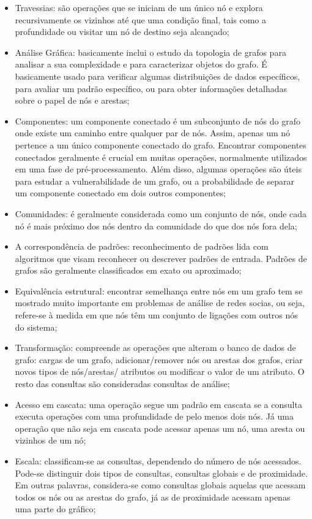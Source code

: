 \begin{itemize}
\item Travessias: são operações que se iniciam de um único nó e explora recursivamente os vizinhos até que uma condição final, tais como a profundidade ou visitar um nó de destino seja alcançado;
\item Análise Gráfica: basicamente inclui o estudo da topologia de grafos para analisar a sua complexidade e para caracterizar objetos do grafo. É basicamente usado para verificar algumas distribuições de dados específicos, para avaliar um padrão específico, ou para obter informações detalhadas sobre o papel de nós e arestas;
\item Componentes: um componente conectado é um subconjunto de nós do grafo onde existe um caminho entre qualquer par de nós. Assim, apenas um nó pertence a um único componente conectado do grafo. Encontrar componentes conectados geralmente é crucial em muitas operações, normalmente utilizados em uma fase de pré-processamento. Além disso, algumas operações são úteis para estudar a vulnerabilidade de um grafo, ou a probabilidade de separar um componente conectado em dois outros componentes;
\item Comunidades: é geralmente considerada como um conjunto de nós, onde cada nó é mais próximo dos nós dentro da comunidade do que dos nós fora dela;
\item A correspondência de padrões: reconhecimento de padrões lida com algoritmos que visam reconhecer ou descrever padrões de entrada. Padrões de grafos são geralmente classificados em exato ou aproximado;
\item Equivalência estrutural: encontrar semelhança entre nós em um grafo tem se mostrado muito importante em problemas de análise de redes socias, ou seja, refere-se à medida em que nós têm um conjunto de ligações com outros nós do sistema;
\item Transformação: compreende as operações que alteram o banco de dados de grafo: cargas de um grafo, adicionar/remover nós ou arestas dos grafos, criar novos tipos de nós/arestas/ atributos ou modificar o valor de um atributo. O resto das consultas são consideradas consultas de análise;
\item Acesso em cascata: uma operação segue um padrão em cascata se a consulta executa operações com uma profundidade de pelo menos dois nós. Já uma operação que não seja em cascata pode acessar apenas um nó, uma aresta ou vizinhos de um nó;
\item Escala: classificam-se as consultas, dependendo do número de nós acessados. Pode-se distinguir dois tipos de consultas, consultas globais e de proximidade. Em outras palavras, considera-se como consultas globais aquelas que acessam todos os nós ou as arestas do grafo, já as de proximidade acessam apenas uma parte do gráfico;

\end{itemize}
